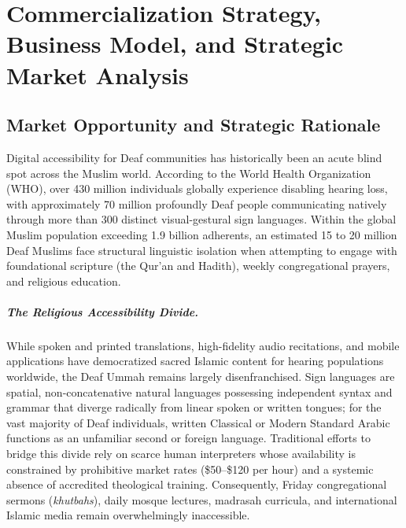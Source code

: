 \chapter{Commercialization Strategy, Business Model, and Strategic Market Analysis}
\label{sec:business}

\section{Market Opportunity and Strategic Rationale}
\label{sec:biz_opportunity}
Digital accessibility for Deaf communities has historically been an acute blind spot across the Muslim world. According to the World Health Organization (WHO), over 430 million individuals globally experience disabling hearing loss, with approximately 70 million profoundly Deaf people communicating natively through more than 300 distinct visual-gestural sign languages. Within the global Muslim population exceeding 1.9 billion adherents, an estimated 15 to 20 million Deaf Muslims face structural linguistic isolation when attempting to engage with foundational scripture (the Qur'an and Hadith), weekly congregational prayers, and religious education.

\paragraph{The Religious Accessibility Divide.}
While spoken and printed translations, high-fidelity audio recitations, and mobile applications have democratized sacred Islamic content for hearing populations worldwide, the Deaf Ummah remains largely disenfranchised. Sign languages are spatial, non-concatenative natural languages possessing independent syntax and grammar that diverge radically from linear spoken or written tongues; for the vast majority of Deaf individuals, written Classical or Modern Standard Arabic functions as an unfamiliar second or foreign language. Traditional efforts to bridge this divide rely on scarce human interpreters whose availability is constrained by prohibitive market rates (\$50--\$120 per hour) and a systemic absence of accredited theological training. Consequently, Friday congregational sermons (\textit{khutbahs}), daily mosque lectures, madrasah curricula, and international Islamic media remain overwhelmingly inaccessible.


